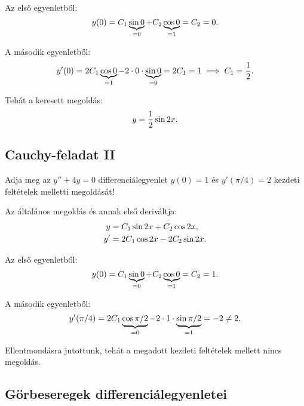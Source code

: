 \documentclass{szb-solution}
\begin{document}
Az első egyenletből:
$$
  y(0)
  = C_1 \underbrace{\sin 0}_{=0} + C_2 \underbrace{\cos 0}_{=1}
  = C_2
  = 0
  \text.
$$

A második egyenletből:
$$
  y'(0)
  = 2C_1 \underbrace{\cos 0}_{=1} - 2 \cdot 0 \cdot \underbrace{\sin 0}_{=0}
  = 2C_1
  = 1
  \implies C_1 = \frac{1}{2}
  \text.
$$

Tehát a keresett megoldás:
$$
  y = \frac{1}{2} \sin 2x
  \text.
$$


\subsection{Cauchy-feladat II}

Adja meg az $y'' + 4y = 0$ differenciálegyenlet $y(0) = 1$ és $y'(\pi/4) = 2$
kezdeti feltételek melletti megoldását!

Az általános megoldás és annak első deriváltja:
\begin{align*}
  y  & = C_1 \sin 2x + C_2 \cos 2x \text,   \\
  y' & = 2C_1 \cos 2x - 2C_2 \sin 2x \text.
\end{align*}

Az első egyenletből:
$$
  y(0)
  = C_1 \underbrace{\sin 0}_{=0} + C_2 \underbrace{\cos 0}_{=1}
  = C_2
  = 1
  \text.
$$

A második egyenletből:
$$
  y'(\pi/4)
  = 2C_1 \underbrace{\cos \pi/2}_{=0} - 2 \cdot 1 \cdot \underbrace{\sin \pi/2}_{=1}
  = -2
  \neq 2
  \text.
$$

Ellentmondásra jutottunk, tehát a megadott kezdeti feltételek mellett nincs
megoldás.


\subsection{Görbeseregek differenciálegyenletei}
\end{document}
